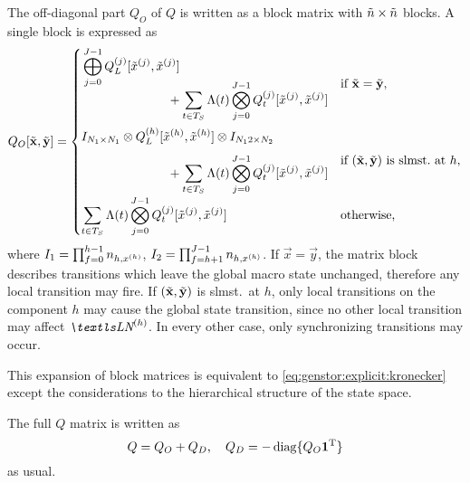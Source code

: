The off-diagonal part $Q_O$ of $Q$ is written as a block matrix with
$\tilde{n} \times \tilde{n}$ blocks. A single block is expressed as
\begin{equation}
  Q_O[\macro{\vec{x}}, \macro{\vec{y}}] = \begin{cases}
    \begin{multlined}[c][7cm]
      \bigkrplus_{j = 0}^{J - 1}
      \loc{Q_L}{j}[\loc{\macro{x}}{j}, \loc{\macro{x}}{j}]\\[-4.5ex]
      + \sum_{t \in T_S} \Lambda(t) \bigkrtimes_{j = 0}^{J - 1}
      \loc{Q_t}{j}[\loc{\macro{x}}{j}, \loc{\macro{x}}{j}]
    \end{multlined}
    & \text{if $\macro{\vec{x}} = \macro{\vec{y}}$,} \\[6.5ex]
    \begin{multlined}[c][7cm]
      I_{N_1 \times N_1} \krtimes
      \loc{Q_L}{h}[\loc{\macro{x}}{h}, \loc{\macro{x}}{h}] \krtimes
      I_{N_12\times N_2} \\[-1.5ex]
      + \sum_{t \in T_S} \Lambda(t) \bigkrtimes_{j = 0}^{J - 1}
      \loc{Q_t}{j}[\loc{\macro{x}}{j}, \loc{\macro{x}}{j}]
    \end{multlined}
    & \text{if
      $(\macro{\vec{x}}, \macro{\vec{y}})$ is slmst.~at $h$,} \\[5ex]
    \displaystyle \sum_{t \in T_S} \Lambda(t) \bigkrtimes_{j = 0}^{J - 1}
      \loc{Q_t}{j}[\loc{\macro{x}}{j}, \loc{\macro{x}}{j}] &
      \text{otherwise,}
  \end{cases}
\end{equation}
where $I_1 = \prod_{f = 0}^{h - 1} n_{h, x^{(h)}}$, $I_2 = \prod_{f
  = h + 1}^{J - 1} n_{h, x^{(h)}}$. If $\vec{x} = \vec{y}$, the
matrix block describes transitions which leave the global macro state
unchanged, therefore any local transition may fire. If
$(\tilde{\bm{\mathrm{x}}}, \tilde{\bm{\mathrm{y}}})$ is slmst.~at $h$, only local
transitions on the component $h$ may cause the global state
transition, since no other local transition may affect $\LN{h}$. In
every other case, only synchronizing transitions may occur.

This expansion of block matrices is equivalent to
\vref{eq:genstor:explicit:kronecker} except the considerations to the
hierarchical structure of the state space.

The full $Q$ matrix is written as
\begin{equation}
  Q = Q_O + Q_D, \quad Q_D = -\operatorname{diag}\{ Q_O \bm{\mathrm{1}}^{\mathrm{T}} \}
\end{equation}
as usual.

